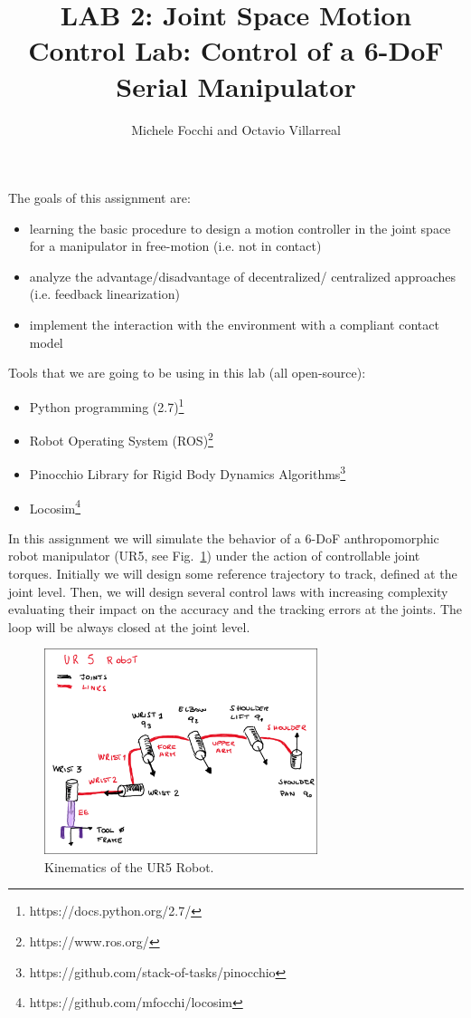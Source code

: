 \documentclass[11pt]{article}
\title{LAB 2: Joint Space Motion Control Lab: Control of a 6-DoF Serial Manipulator}
\author{Michele Focchi and Octavio Villarreal}
\date{}
\begin{document}
	\maketitle
	\noindent
	The goals of this assignment are:
	\begin{itemize}
		\item learning the basic procedure to design a motion controller in the joint space for a manipulator in free-motion (i.e. not in contact)
		\item analyze the advantage/disadvantage of decentralized/ centralized approaches (i.e. feedback linearization)
		\item implement the interaction with the environment with a compliant contact model	 
	\end{itemize}
	
	\noindent
	Tools that we are going to be using in this lab (all open-source):
	\begin{itemize}
		\item Python programming (2.7)\footnote{https://docs.python.org/2.7/}
		\item Robot Operating System (ROS)\footnote{https://www.ros.org/}
		\item Pinocchio Library for Rigid Body Dynamics Algorithms\footnote{https://github.com/stack-of-tasks/pinocchio}
		\item Locosim\footnote{https://github.com/mfocchi/locosim}
	\end{itemize}
	In this assignment we will simulate the behavior of a 6-DoF anthropomorphic robot manipulator (UR5, see  Fig.~\ref{fig:UR5}) under the action of controllable joint torques. Initially we will design some reference trajectory to track, defined at the joint level. Then, we will design several control laws with increasing complexity evaluating their impact on the accuracy and the tracking errors at the joints. The loop will be always closed at the joint level.  
 
 \begin{figure}[bht]
 	\centering
 	\includegraphics[width=8cm]{pics/ur5_Robot.pdf}
 	\caption{Kinematics of the UR5 Robot.}
 	\label{fig:UR5}
 \end{figure}
\end{document}
